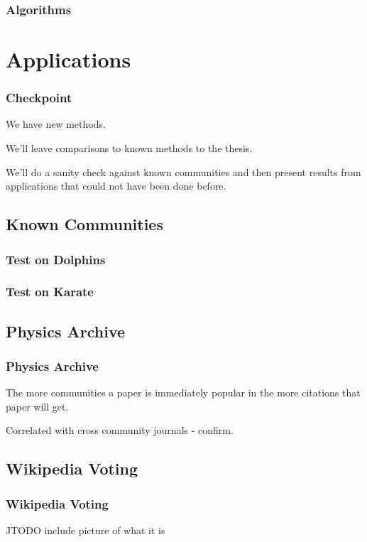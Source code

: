 \documentclass{beamer}
\begin{document}
\begin{frame}\frametitle{Algorithms}

\end{frame}


\section{Applications}


\begin{frame}\frametitle{Checkpoint}

We have new methods. 

We'll leave comparisons to known methods to the thesis.

We'll do a sanity check against known communities and then present results from applications that could not have been done before.
\end{frame}


\subsection{Known Communities}

\begin{frame}\frametitle{Test on Dolphins}

\end{frame}


\begin{frame}\frametitle{Test on Karate}

\end{frame}


\subsection{Physics Archive}



\begin{frame}\frametitle{Physics Archive}
The more communities a paper is immediately popular in the more citations that paper will get.

Correlated with cross community journals - confirm.
\end{frame}


\subsection{Wikipedia Voting}

\begin{frame}\frametitle{Wikipedia Voting}

JTODO include picture of what it is

\end{frame}
\end{document}

